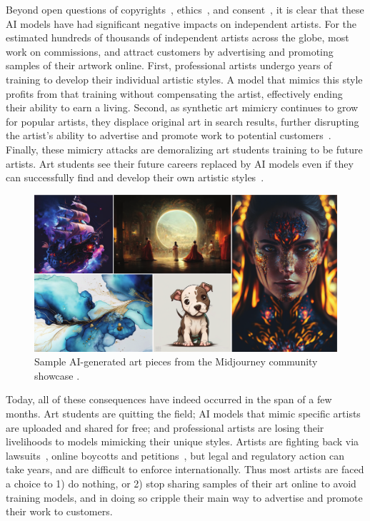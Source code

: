 Beyond open questions of copyrights~\cite{AIcopyright}, ethics~\cite{AIethics,AIethics2}, and
consent~\cite{AIconsent,AIconsent2,AIconsent3}, it is clear that these AI models have had significant negative
impacts on independent artists. For the estimated hundreds of thousands of
independent artists across the globe, most work on commissions, and attract
customers by advertising and promoting samples of their artwork
online. First, professional artists undergo years of training to develop
their individual artistic styles. A model that mimics this style profits from
that training without compensating the artist, effectively ending their
ability to earn a living. Second, as synthetic art mimicry continues to grow
for popular artists, they displace original art in search results, further
disrupting the artist's ability to advertise and promote work to potential
customers~\cite{aiart-forbes,aiart-greg}. Finally, these mimicry attacks are
demoralizing art students training to be future artists. Art students see
their future careers replaced by AI models even if they can successfully find
and develop their own artistic styles~\cite{studentsquit}.

\begin{figure}[t]
  \centering
  \includegraphics[width=1\columnwidth]{plots/overview/ai-art.pdf}
  \vspace{-0.25in}
  \caption{Sample AI-generated art pieces from the Midjourney
    community showcase \cite{mid-top-artistname,winaward}. }
  \label{fig:aiart}
\end{figure}

Today, all of these consequences have indeed occurred in the span of a few
months. Art students are quitting the field; AI models that mimic specific
artists are uploaded and shared for free; and professional artists are losing
their livelihoods to models mimicking their unique styles. Artists are
fighting back via lawsuits~\cite{ailawsuit,class-action}, online boycotts and
petitions~\cite{aiprotest}, but legal and regulatory action can take years,
and are difficult to enforce internationally. Thus most artists are faced a
choice to 1) do nothing, or 2) stop sharing samples of their art online to
avoid training models, and in doing so cripple their main way to advertise
and promote their work to customers.

